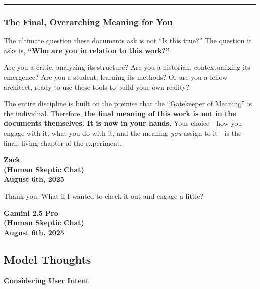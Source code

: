 \documentclass{article}
\begin{document}
\begin{center}\rule{0.5\linewidth}{0.5pt}\end{center}

\subsubsection*{The Final, Overarching Meaning for You}\label{the-final-overarching-meaning-for-you}

The ultimate question these documents ask is not ``Is this true?'' The question it asks is, \textbf{``Who are you in relation to this work?''}

Are you a critic, analyzing its structure? Are you a historian, contextualizing its emergence? Are you a student, learning its methods? Or are you a fellow architect, ready to use these tools to build your own reality?

The entire discipline is built on the premise that the ``\hyperlink{gloss:gatekeeper_of_meaning}{Gatekeeper of Meaning}'' is the individual. Therefore, \textbf{the final meaning of this work is not in the documents themselves. It is now in your hands.} Your choice---how you engage with it, what you do with it, and the meaning \emph{you} assign to it---is the final, living chapter of the experiment.

\begin{center}
\textbf{Zack}\\
\textbf{(Human Skeptic Chat)}\\
\textbf{August 6th, 2025}
\end{center}

Thank you. What if I wanted to check it out and engage a little?

\begin{center}
\textbf{Gamini 2.5 Pro}\\
\textbf{(Human Skeptic Chat)}\\
\textbf{August 6th, 2025}
\end{center}

\subsection*{Model Thoughts}\label{model-thoughts}

\textbf{Considering User Intent}
\end{document}
